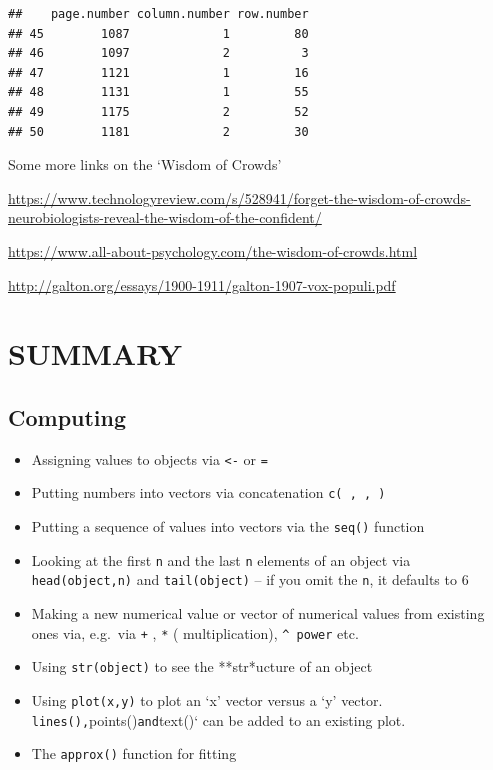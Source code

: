 \documentclass[]{book}
\begin{document}
\begin{verbatim}
##    page.number column.number row.number
## 45        1087             1         80
## 46        1097             2          3
## 47        1121             1         16
## 48        1131             1         55
## 49        1175             2         52
## 50        1181             2         30
\end{verbatim}

Some more links on the `Wisdom of Crowds'

\url{https://www.technologyreview.com/s/528941/forget-the-wisdom-of-crowds-neurobiologists-reveal-the-wisdom-of-the-confident/}

\url{https://www.all-about-psychology.com/the-wisdom-of-crowds.html}

\url{http://galton.org/essays/1900-1911/galton-1907-vox-populi.pdf}

\hypertarget{summary-2}{%
\section{SUMMARY}\label{summary-2}}

\hypertarget{computing}{%
\subsection{Computing}\label{computing}}

\begin{itemize}
\item
  Assigning values to objects via \texttt{\textless{}-} or \texttt{=}
\item
  Putting numbers into vectors via concatenation \texttt{c(\ ,\ ,\ )}
\item
  Putting a sequence of values into vectors via the \texttt{seq()} function
\item
  Looking at the first \texttt{n} and the last \texttt{n} elements of an object via \texttt{head(object,n)} and \texttt{tail(object)} -- if you omit the \texttt{n}, it defaults to 6
\item
  Making a new numerical value or vector of numerical values from existing ones via, e.g.~via \texttt{+} , \texttt{*} ( multiplication), \texttt{\^{}\ power} etc.
\item
  Using \texttt{str(object)} to see the **str*ucture of an object
\item
  Using \texttt{plot(x,y)} to plot an `x' vector versus a `y' vector. \texttt{lines(),}points()\texttt{and}text()` can be added to an existing plot.
\item
  The \texttt{approx()} function for fitting
\end{itemize}
\end{document}
